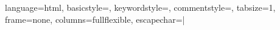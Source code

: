 
 {
   language=html,
   basicstyle=\tiny\ttfamily,
   keywordstyle=\ttfamily,
   commentstyle=\color{gray}\ttfamily,
   tabsize=1,
   frame=none,
   columns=fullflexible,
   escapechar=| %
}